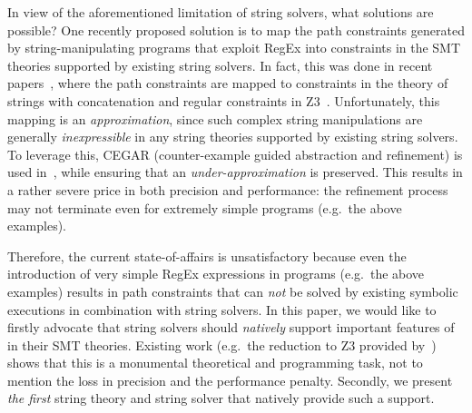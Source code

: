 In view of the aforementioned limitation of string solvers, what solutions are
possible? One recently proposed solution is to map the path constraints
generated by string-manipulating programs that exploit RegEx into constraints
in the SMT theories
supported by existing string solvers. In fact, this was done in recent papers~\cite{LMK19}, where the path constraints are mapped to constraints
in the theory of strings with concatenation and regular constraints in Z3~\cite{Z3}. Unfortunately, this mapping is an \emph{approximation}, since
such complex string manipulations are generally \emph{inexpressible} in any 
string theories supported by existing string solvers.
%
To leverage this, CEGAR (counter-example guided 
abstraction and refinement) is used in~\cite{LMK19}, while ensuring that an
\emph{under-approximation} is preserved. 
This results in a rather severe price in both precision and performance: the
refinement process may not terminate even for extremely simple programs
(e.g.\ the above examples).

Therefore, the current state-of-affairs is unsatisfactory because even 
the introduction of very simple RegEx expressions in programs (e.g.\ the above 
examples) results in path constraints that can \emph{not} be solved by existing 
symbolic executions in combination with string solvers. In this paper, we would
like to firstly advocate that string solvers should \emph{natively} support
important features of \regexp{}
in their SMT theories. 
Existing work
(e.g.\ the reduction to Z3 provided by~\cite{LMK19}) shows that this is a 
monumental theoretical and programming task, 
not to mention the loss in precision and the performance penalty. Secondly, we 
present \emph{the first} string
theory and string solver that natively provide such a support.


